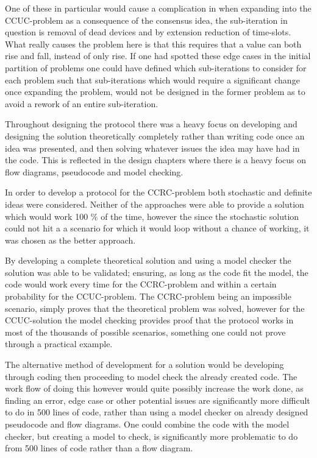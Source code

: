 One of these in particular would cause a complication in when expanding into the CCUC-problem as a consequence of the consensus idea, the sub-iteration in question is removal of dead devices and by extension reduction of time-slots.
What really causes the problem here is that this requires that a value can both rise and fall, instead of only rise.
If one had spotted these edge cases in the initial partition of problems one could have defined which sub-iterations to consider for each problem such that sub-iterations which would require a significant change once expanding the problem, would not be designed in the former problem as to avoid a rework of an entire sub-iteration.

\bigskip \noindent
Throughout designing the protocol there was a heavy focus on developing and designing the solution theoretically completely rather than writing code once an idea was presented, and then solving whatever issues the idea may have had in the code.
This is reflected in the design chapters where there is a heavy focus on flow diagrams, pseudocode and model checking.

In order to develop a protocol for the CCRC-problem both stochastic and definite ideas were considered.
Neither of the approaches were able to provide a solution which would work 100 \% of the time, however the since the stochastic solution could not hit a a scenario for which it would loop without a chance of working, it was chosen as the better approach.

By developing a complete theoretical solution and using a model checker the solution was able to be validated; ensuring, as long as the code fit the model, the code would work every time for the CCRC-problem and within a certain probability for the CCUC-problem.
The CCRC-problem being an impossible scenario, simply proves that the theoretical problem was solved, however for the CCUC-solution the model checking provides proof that the protocol works in most of the thousands of possible scenarios, something one could not prove through a practical example.

The alternative method of development for a solution would be developing through coding then proceeding to model check the already created code.
The work flow of doing this however would quite possibly increase the work done, as finding an error, edge case or other potential issues are significantly more difficult to do in 500 lines of code, rather than using a model checker on already designed pseudocode and flow diagrams.
One could combine the code with the model checker, but creating a model to check, is significantly more problematic to do from 500 lines of code rather than a flow diagram.

